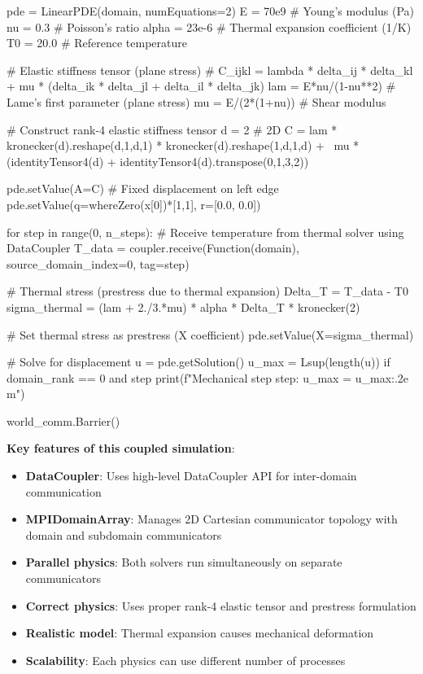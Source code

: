 \begin{python}
    pde = LinearPDE(domain, numEquations=2)
    E = 70e9        # Young's modulus (Pa)
    nu = 0.3        # Poisson's ratio
    alpha = 23e-6   # Thermal expansion coefficient (1/K)
    T0 = 20.0       # Reference temperature

    # Elastic stiffness tensor (plane stress)
    # C_ijkl = lambda * delta_ij * delta_kl + mu * (delta_ik * delta_jl + delta_il * delta_jk)
    lam = E*nu/(1-nu**2)       # Lame's first parameter (plane stress)
    mu = E/(2*(1+nu))           # Shear modulus

    # Construct rank-4 elastic stiffness tensor
    d = 2  # 2D
    C = lam * kronecker(d).reshape(d,1,d,1) * kronecker(d).reshape(1,d,1,d) + \
        mu * (identityTensor4(d) + identityTensor4(d).transpose(0,1,3,2))

    pde.setValue(A=C)
    # Fixed displacement on left edge
    pde.setValue(q=whereZero(x[0])*[1,1], r=[0.0, 0.0])

    for step in range(0, n_steps):
        # Receive temperature from thermal solver using DataCoupler
        T_data = coupler.receive(Function(domain), source_domain_index=0, tag=step)

        # Thermal stress (prestress due to thermal expansion)
        Delta_T = T_data - T0
        sigma_thermal = (lam + 2./3.*mu) * alpha * Delta_T * kronecker(2)

        # Set thermal stress as prestress (X coefficient)
        pde.setValue(X=sigma_thermal)

        # Solve for displacement
        u = pde.getSolution()
        u_max = Lsup(length(u))
        if domain_rank == 0 and step %
            print(f"Mechanical step {step}: u_max = {u_max:.2e} m")

world_comm.Barrier()
\end{python}

\textbf{Key features of this coupled simulation}:
\begin{itemize}
\item \textbf{DataCoupler}: Uses high-level DataCoupler API for inter-domain communication
\item \textbf{MPIDomainArray}: Manages 2D Cartesian communicator topology with domain and subdomain communicators
\item \textbf{Parallel physics}: Both solvers run simultaneously on separate communicators
\item \textbf{Correct physics}: Uses proper rank-4 elastic tensor and prestress formulation
\item \textbf{Realistic model}: Thermal expansion causes mechanical deformation
\item \textbf{Scalability}: Each physics can use different number of processes
\end{itemize}

